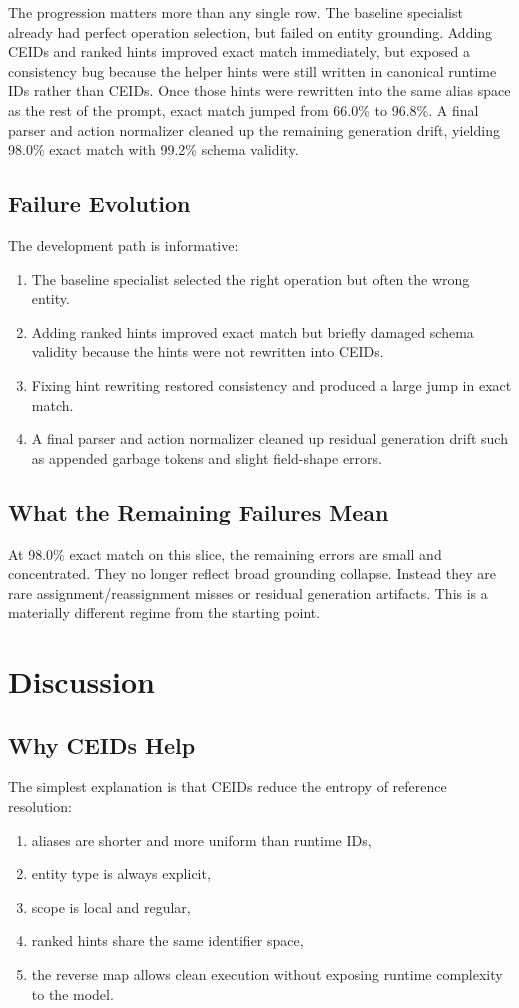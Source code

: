 \documentclass[manuscript,screen,review]{jair}
\begin{document}
The progression matters more than any single row. The baseline specialist already had perfect operation selection, but failed on entity grounding. Adding CEIDs and ranked hints improved exact match immediately, but exposed a consistency bug because the helper hints were still written in canonical runtime IDs rather than CEIDs. Once those hints were rewritten into the same alias space as the rest of the prompt, exact match jumped from 66.0\% to 96.8\%. A final parser and action normalizer cleaned up the remaining generation drift, yielding 98.0\% exact match with 99.2\% schema validity.

\subsection{Failure Evolution}
The development path is informative:
\begin{enumerate}[leftmargin=*,itemsep=0.25em]
  \item The baseline specialist selected the right operation but often the wrong entity.
  \item Adding ranked hints improved exact match but briefly damaged schema validity because the hints were not rewritten into CEIDs.
  \item Fixing hint rewriting restored consistency and produced a large jump in exact match.
  \item A final parser and action normalizer cleaned up residual generation drift such as appended garbage tokens and slight field-shape errors.
\end{enumerate}

\subsection{What the Remaining Failures Mean}
At 98.0\% exact match on this slice, the remaining errors are small and concentrated. They no longer reflect broad grounding collapse. Instead they are rare assignment/reassignment misses or residual generation artifacts. This is a materially different regime from the starting point.

\section{Discussion}
\subsection{Why CEIDs Help}
The simplest explanation is that CEIDs reduce the entropy of reference resolution:
\begin{enumerate}[leftmargin=*,itemsep=0.25em]
  \item aliases are shorter and more uniform than runtime IDs,
  \item entity type is always explicit,
  \item scope is local and regular,
  \item ranked hints share the same identifier space,
  \item the reverse map allows clean execution without exposing runtime complexity to the model.
\end{enumerate}
\end{document}
